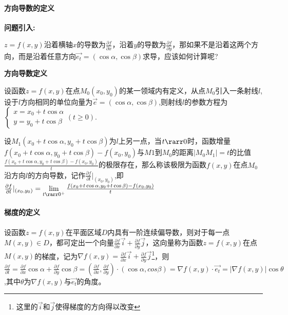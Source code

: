 \documentclass[
]{article}
\begin{document}
\hypertarget{ux65b9ux5411ux5bfcux6570ux7684ux5b9aux4e49}{%
\paragraph{方向导数的定义}\label{ux65b9ux5411ux5bfcux6570ux7684ux5b9aux4e49}}

\textbf{问题引入:}

\(z=f(x,y)\)沿着横轴\(x\)的导数为\(\frac{\partial{f}}{\partial{x}}\)，沿着\(y\)的导数为\(\frac{\partial{f}}{\partial{y}}\)，那如果不是沿着这两个方向，而是沿着任意方向\(\vec{e_t} =(\cos\alpha,\cos\beta)\)求导，应该如何计算呢?

\textbf{方向导数定义}

设函数\(z = f(x,y)\)在点\(M_0(x_0,y_0)\)的某一领域内有定义，从点\(M_0\)引入一条射线\(l\),设于\(l\)方向相同的单位向量为\(\vec{e}=(\cos \alpha,\cos\beta)\),则射线\(l\)的参数方程为\(\left \{ \begin{aligned} x = x_0 + t\cos\alpha \\y=y_0+t\cos\beta \end{aligned} (t\ge 0) \right.\).

设\(M_1(x_0+t\cos\alpha,y_0+t\cos\beta)\)为\(l\)上另一点，当\(t \rarr 0\)时，函数增量\(f(x_0+t\cos\alpha,y_0+t\cos\beta)-f(x_0,y_0)\)与\(M1\)到\(M_0\)的距离\(\vert M_0M_1 \vert = t\)的比值\(\frac{f(x_0+t\cos\alpha,y_0+t\cos\beta)-f(x_0,y_0)}{t}\)的极限存在，那么称该极限为函数\(f(x,y)\)在点\(M_0\)沿方向\(l\)的方向导数，记作\(\frac{\partial{f}}{\partial{l}}\vert_{(x_0,y_0)}\),即\(\frac{\partial{f}}{\partial{l}}\vert_{(x_0,y_0)} = \lim\limits_{t \rarr 0^+}\frac{f(x_0+t\cos\alpha,y_0+t\cos\beta)-f(x_0,y_0)}{t}\)

\hypertarget{ux68afux5ea6ux7684ux5b9aux4e49}{%
\paragraph{梯度的定义}\label{ux68afux5ea6ux7684ux5b9aux4e49}}

设函数\(z=f(x,y)\)在平面区域\(D\)内具有一阶连续偏导数，则对于每一点\(M(x,y) \in D\)，都可定出一个向量\(\frac{\partial{f}}{\partial{x}} \vec{i}+ \frac{\partial{f}}{\partial{y}} \vec{j}\)，这向量称为函数\(z=f(x,y)\)在点\(M(x,y)\)的梯度，记为\(\nabla f(x,y)= \frac{\partial{f}}{\partial{x}} \vec{i}+ \frac{\partial{f}}{\partial{y}} \vec{j}\)\footnote{这里的\(\vec{i}和\vec{j}使得梯度的方向得以改变\)}，则\(\frac{\partial{f}}{\partial{l}}=\frac{\partial{f}}{\partial{x}} \cos\alpha+ \frac{\partial{f}}{\partial{y}} \cos\beta = (\frac{\partial{f}}{\partial{x}},\frac{\partial{f}}{\partial{y}})\cdot (\cos\alpha,cos\beta)=\nabla f(x,y)\cdot\vec{e_t}=\vert \nabla f(x,y) \vert \cos \theta\),其中\(\theta\)为\(\nabla f(x,y)\)与\(\vec{e_t}\)的角度。
\end{document}
